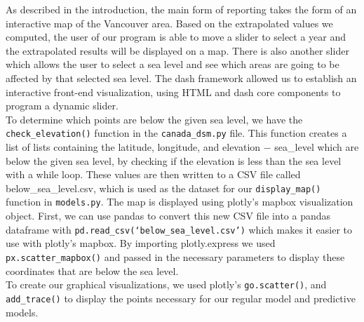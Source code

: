 \documentclass[fontsize=11pt]{article}
\begin{document}
    \hspace{\parindent}As described in the introduction, the main form of reporting takes the form of an interactive map of the Vancouver area. Based on the extrapolated values we computed, the user of our program is able to move a slider to select a year and the extrapolated results will be displayed on a map. There is also another slider which allows the user to select a sea level and see which areas are going to be affected by that selected sea level. The dash framework allowed us to establish an interactive front-end visualization, using HTML and dash core components to program a dynamic slider. \\

    To determine which points are below the given sea level, we have the \texttt{check\_elevation()} function in the \texttt{canada\_dsm.py} file. This function creates a list of lists containing the latitude, longitude, and elevation $-$ sea\_level which are below the given sea level, by checking if the elevation is less than the sea level with a while loop. These values are then written to a CSV file called below\_sea\_level.csv, which is used as the dataset for our \texttt{display\_map()} function in \texttt{models.py}. The map is displayed using plotly’s mapbox visualization object. First, we can use pandas to convert this new CSV file into a pandas dataframe with \texttt{pd.read\_csv(‘below\_sea\_level.csv’)} which makes it easier to use with plotly’s mapbox. By importing plotly.express we used \texttt{px.scatter\_mapbox()} and passed in the necessary parameters to display these coordinates that are below the sea level. \\

    To create our graphical visualizations, we used plotly’s \texttt{go.scatter()}, and \texttt{add\_trace()} to display the points necessary for our regular model and predictive models.
\end{document}
